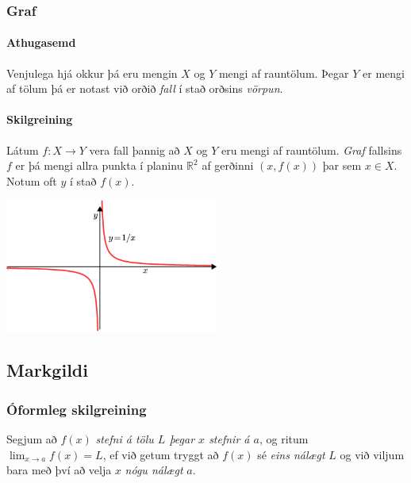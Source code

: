 \documentclass[icelandic,a4paper,12pt]{article}
\newcommand{\R}{{\mathbb  R}}
\begin{document}
\subsubsection*{Graf}
\paragraph{Athugasemd}
 Venjulega hjá okkur þá eru mengin $X$ og $Y$ mengi af rauntölum. Þegar $Y$ er
mengi af tölum þá er notast við orðið \emph{fall} í stað orðsins 
\emph{vörpun}.


\pause

\paragraph{Skilgreining}
Látum $f:X \to Y$ vera fall þannig að $X$ og $Y$ eru mengi 
af rauntölum. \emph{Graf} fallsins $f$ er þá mengi allra punkta í planinu
$\R^2$ af gerðinni $(x,f(x))$ þar sem $x\in X$. 
Notum oft $y$ í stað $f(x)$.


\begin{center}
\includegraphics[width=7cm,keepaspectratio=true]{./myndir/kafli01/02_Graf.png}
\end{center}



\subsection*{Markgildi}

\subsubsection*{Óformleg skilgreining}  
Segjum að  $f(x)$
{\it stefni á tölu $L$ þegar $x$ stefnir á $a$}, og ritum
$\lim_{x\rightarrow a} f(x)=L$, ef við getum tryggt að  $f(x)$ sé {\em
  eins nálægt}
$L$ og við viljum bara með því að velja $x$ {\em nógu nálægt} $a$.  
\end{document}
